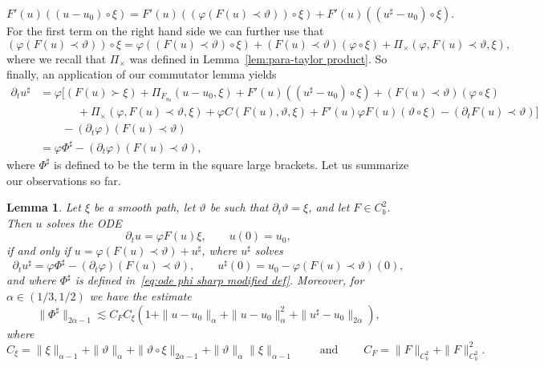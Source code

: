 \documentclass[11pt,a4paper]{article}
\newcommand{\tmop}[1]{\ensuremath{\operatorname{#1}}}
\newtheorem{lemma}[theorem]{Lemma}
\theoremstyle{remark}
\begin{document}
\[
   F' ( u )  ( ( u-u_{0} ) \circ \xi ) =F' ( u ) ( ( \varphi ( F ( u ) \prec \vartheta ) ) \circ \xi )  +F' ( u ) ( ( u^{\sharp} -u_{0} ) \circ \xi ).
\]
For the first term on the right hand side we can further use that
\[
   ( \varphi ( F ( u ) \prec \vartheta ) ) \circ \xi = \varphi ( ( F (u ) \prec \vartheta ) \circ \xi ) + ( F ( u ) \prec \vartheta ) (\varphi \circ \xi ) + \Pi_{\times} ( \varphi ,F ( u ) \prec   \vartheta , \xi ),
\]
where we recall that $\Pi_\times$ was defined in Lemma~\ref{lem:para-taylor product}. So finally, an application of our commutator lemma yields
\begin{align}\label{eq:ode phi sharp modified def} \nonumber
   \partial_{t} u^{\sharp} & = \varphi \bigg[ ( F ( u ) \succ \xi ) + \Pi_{F_{u_{0}}} ( u-u_{0} , \xi ) +F' ( u ) ( ( u^{\sharp} -u_{0} ) \circ \xi ) + ( F ( u ) \prec \vartheta ) ( \varphi \circ \xi ) \\ \nonumber
   &\hspace{40pt} + \Pi_{\times} ( \varphi ,F ( u ) \prec \vartheta , \xi ) + \varphi C ( F ( u ) , \vartheta , \xi ) +F' ( u ) \varphi F ( u ) ( \vartheta \circ \xi ) - ( \partial_{t} F ( u ) \prec \vartheta ) \bigg] \\ \nonumber
   &\qquad - ( \partial_{t} \varphi )  ( F ( u ) \prec \vartheta ) \\
   & = \varphi \Phi^{\sharp} - (\partial_{t} \varphi )  ( F ( u ) \prec \vartheta ),
\end{align}
where $\Phi^\sharp$ is defined to be the term in the square large brackets. Let us summarize our observations so far.

\begin{lemma}
  Let $\xi$ be a smooth path, let $\vartheta$ be such that $\partial_{t}  \vartheta = \xi$, and let $F \in C^{2}_{b}$. Then
  $u$ solves the ODE
  \[
     \partial_{t} u= \varphi F ( u ) \xi, \qquad u ( 0 ) =u_{0},
  \]
  if and only if $u= \varphi ( F (u ) \prec \vartheta ) +u^{\sharp}$, where $u^{\sharp}$ solves
  \[
     \partial_{t} u^{\sharp} = \varphi \Phi^{\sharp} - ( \partial_{t} \varphi )  ( F ( u ) \prec \vartheta ), \qquad u^{\sharp} ( 0 ) =u_{0} - \varphi ( F ( u )\prec \vartheta ) ( 0 ),
  \]
  and where $\Phi^{\sharp}$ is defined in~\eqref{eq:ode phi sharp modified def}. Moreover, for $\alpha \in ( 1/3,1/2 )$ we have the estimate
  \[
     \| \Phi^{\sharp} \|_{2 \alpha -1} \lesssim C_{F} C_{\xi} ( 1+ \| u-u_{0}  \|_{\alpha} + \| u-u_{0} \|^{2}_{\alpha} + \| u^{\sharp} -u_{0} \|_{2 \alpha} ),
  \]
  where
  \[
     C_{\xi} = \| \xi \|_{\alpha -1} + \| \vartheta \|_{\alpha} + \| \vartheta \circ   \xi \|_{2 \alpha -1} + \| \vartheta \|_{\alpha} \| \xi \|_{\alpha -1} \qquad \tmop{and} \qquad C_{F} = \| F \|_{C^{2}_{b}} + \| F \|_{C^{2}_{b}}^{2} .
  \]   
\end{lemma}
\end{document}
